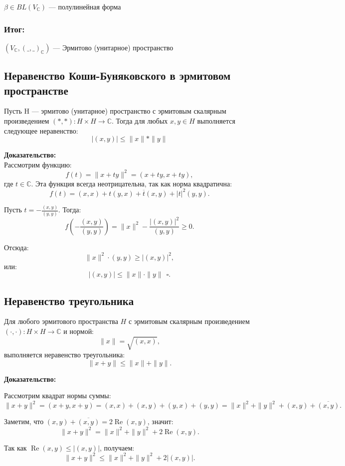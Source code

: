 \documentclass[12pt]{article}
\begin{document}
$\beta \in BL(V_\mathbb{C})$ — полулинейная форма

\subsubsection*{Итог:}
$(V_\mathbb{C}, (  \_ , \_ )_\mathbb{C})$ — Эрмитово (унитарное) пространство

\subsection{Неравенство Коши-Буняковского в  эрмитовом пространстве}

Пусть H — эрмитово (унитарное) пространство с эрмитовым скалярным произведением $(*, *) : H\times H \to \mathbb{C}.$ Тогда для любых $x, y \in H$ выполняется следующее неравенство:
\[
|(x,y)| \leq \|x\| * \|y\|
\]

\textbf{Доказательство:}
\[\]
Рассмотрим функцию:
\[
f(t) = \|x + ty\|^2 = (x + ty, x + ty),
\]
где $t \in \mathbb{C}$. Эта функция всегда неотрицательна, так как норма квадратична:
\[
f(t) = (x, x) + t(y, x) + \overline{t}(x, y) + |t|^2(y, y).
\]

Пусть $t = -\frac{(x, y)}{(y, y)}$. Тогда:
\[
f\left(-\frac{(x, y)}{(y, y)}\right) = \|x\|^2 - \frac{|(x, y)|^2}{(y, y)} \geq 0.
\]

Отсюда:
\[
\|x\|^2 \cdot (y, y) \geq |(x, y)|^2,
\]
или:
\[
|(x, y)| \leq \|x\| \cdot \|y\| \ \ \square.
\]

\subsection{Неравенство треугольника}

Для любого эрмитового пространства $H$ с эрмитовым скалярным произведением $(\cdot, \cdot): H \times H \to \mathbb{C}$ и нормой:
\[
\|x\| = \sqrt{(x, x)},
\]
выполняется неравенство треугольника:
\[
\|x + y\| \leq \|x\| + \|y\|.
\]

\textbf{Доказательство:}

Рассмотрим квадрат нормы суммы:
\[
\|x + y\|^2 = (x + y, x + y) = (x, x) + (x, y) + (y, x) + (y, y) = \|x\|^2 + \|y\|^2 + (x, y) + \overline{(x, y)}.
\]

Заметим, что $(x, y) + \overline{(x, y)} = 2 \operatorname{Re}(x, y)$, значит:
\[
\|x + y\|^2 = \|x\|^2 + \|y\|^2 + 2 \operatorname{Re}(x, y).
\]

Так как $\operatorname{Re}(x, y) \leq |(x, y)|$, получаем:
\[
\|x + y\|^2 \leq \|x\|^2 + \|y\|^2 + 2 |(x, y)|.
\]
\end{document}

